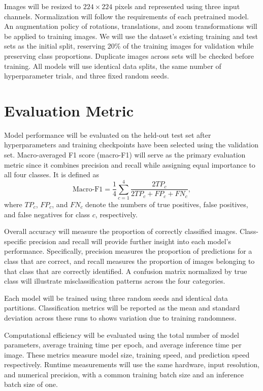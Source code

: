 \documentclass{article}
\begin{document}
Images will be resized to \(224 \times 224\) pixels and represented using three input channels. Normalization will follow the requirements
of each pretrained model. An augmentation policy of rotations, translations, and zoom transformations will be applied to training images.
We will use the dataset's existing training and test sets as the initial split, reserving 20\% of the training images for validation while
preserving class proportions. Duplicate images across sets will be checked before training. All models will use identical data splits,
the same number of hyperparameter trials, and three fixed random seeds.

\section*{Evaluation Metric}
Model performance will be evaluated on the held-out test set after hyperparameters and training checkpoints have been selected using the
validation set. Macro-averaged F1 score (macro-F1) will serve as the primary evaluation metric since it combines precision and recall while
assigning equal importance to all four classes. It is defined as
\[
\mathrm{Macro\text{-}F1}
=\frac{1}{4}\sum_{c=1}^{4}
\frac{2TP_c}{2TP_c+FP_c+FN_c},
\]
where \(TP_c\), \(FP_c\), and \(FN_c\) denote the numbers of true positives, false positives, and false negatives for class \(c\), respectively.

Overall accuracy will measure the proportion of correctly classified images. Class-specific precision and recall will provide further insight
into each model's performance. Specifically, precision measures the proportion of predictions for a class that are correct, and recall measures the
proportion of images belonging to that class that are correctly identified. A confusion matrix normalized by true class will illustrate
misclassification patterns across the four categories.

Each model will be trained using three random seeds and identical data partitions. Classification metrics will be reported as the mean and
standard deviation across these runs to shows variation due to training randomness.

Computational efficiency will be evaluated using the total number of model parameters, average training time per epoch, and average inference
time per image. These metrics measure model size, training speed, and prediction speed respectively. Runtime measurements will use the
same hardware, input resolution, and numerical precision, with a common training batch size and an inference batch size of one.
\end{document}
